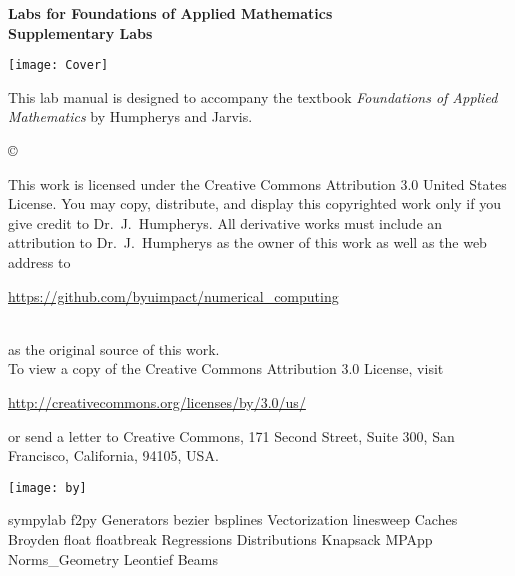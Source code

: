 \documentclass[nociteref]{SIAM-GH-book}
\begin{document}



\thispagestyle{empty}
\begin{center}
 
{\huge \bf Labs for Foundations of Applied Mathematics} \\
\vspace{5mm}
{\Large \bf Supplementary Labs}
\vspace{20mm}

\texttt{[image: Cover]}
\end{center}
\frontmatter




\begin{thepreface}
This lab manual is designed to accompany the textbook \emph{Foundations of Applied Mathematics} by Humpherys and Jarvis.

\vfill
\copyright{This work is licensed under the Creative Commons Attribution 3.0 United States
License.  You may copy, distribute, and display this copyrighted work only if you give
credit to Dr.~J.~Humpherys. All derivative works must include an attribution to Dr.~J.~Humpherys as the owner of this work as well as the web address to
\\\centerline{\url{https://github.com/byuimpact/numerical_computing}}\\ as the original source of
this
work.\\To view a copy of the Creative Commons Attribution 3.0 License,
visit\\\centerline{\url{http://creativecommons.org/licenses/by/3.0/us/}} or send a letter to
Creative Commons, 171 Second Street, Suite 300, San Francisco, California, 94105, USA.}

\vfill
\centering\texttt{[image: by]}
\vfill
\end{thepreface}

\setcounter{tocdepth}{1}
\tableofcontents

\mainmatter
{sympylab}
{f2py}
{Generators}
{bezier}
{bsplines}
{Vectorization}
{linesweep}
{Caches}
{Broyden}
{float}
{floatbreak}
{Regressions}
{Distributions}
{Knapsack}
{MPApp}
{Norms_Geometry}
{Leontief}
{Beams}
\end{document}
